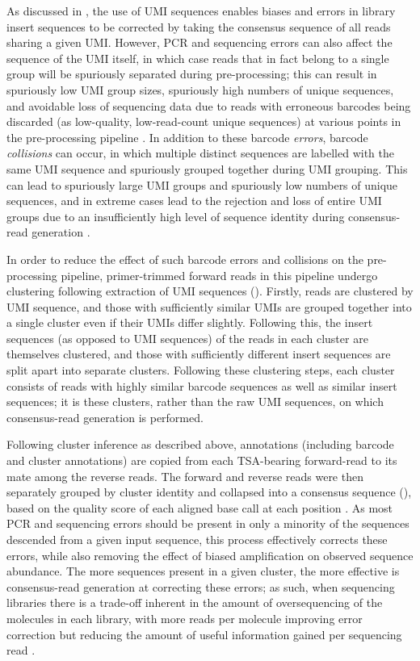 As discussed in , the use of UMI sequences enables biases and errors in library insert sequences to be corrected by taking the consensus sequence of all reads sharing a given UMI. However, PCR and sequencing errors can also affect the sequence of the UMI itself, in which case reads that in fact belong to a single group will be spuriously separated during pre-processing; this can result in spuriously low UMI group sizes, spuriously high numbers of unique sequences, and avoidable loss of sequencing data due to reads with erroneous barcodes being discarded (as low-quality, low-read-count unique sequences) at various points in the pre-processing pipeline \parencite{shlemov2017igrec}. In addition to these barcode \textit{errors}, barcode \textit{collisions} can occur, in which multiple distinct sequences are labelled with the same UMI sequence and spuriously grouped together during UMI grouping. This can lead to spuriously large UMI groups and spuriously low numbers of unique sequences, and in extreme cases lead to the rejection and loss of entire UMI groups due to an insufficiently high level of sequence identity during consensus-read generation \parencite{shlemov2017igrec}.

In order to reduce the effect of such barcode errors and collisions on the pre-processing pipeline, primer-trimmed forward reads in this pipeline undergo clustering following extraction of UMI sequences (). Firstly, reads are clustered by UMI sequence, and those with sufficiently similar UMIs are grouped together into a single cluster even if their UMIs differ slightly. Following this, the insert sequences (as opposed to UMI sequences) of the reads in each cluster are themselves clustered, and those with sufficiently different insert sequences are split apart into separate clusters. Following these clustering steps, each cluster consists of reads with highly similar barcode sequences as well as similar insert sequences; it is these clusters, rather than the raw UMI sequences, on which consensus-read generation is performed.

Following cluster inference as described above, annotations (including barcode and cluster annotations) are copied from each TSA-bearing forward-read to its mate among the reverse reads. The forward and reverse reads were then separately grouped by cluster identity and collapsed into a consensus sequence (), based on the quality score of each aligned base call at each position \parencite{vanderheiden2014presto}. As most PCR and sequencing errors should be present in only a minority of the sequences descended from a given input sequence, this process effectively corrects these errors, while also removing the effect of biased amplification on observed sequence abundance. The more sequences present in a given cluster, the more effective is consensus-read generation at correcting these errors; as such, when sequencing \igseq libraries there is a trade-off inherent in the amount of oversequencing of the molecules in each library, with more reads per molecule improving error correction but reducing the amount of useful information gained per sequencing read \parencite{turchaninova2016igprep}.

